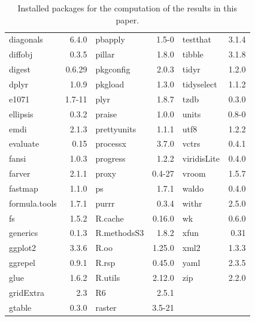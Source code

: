\begin{table}[h]
\begin{tabular}{lr|lr|lr}
			diagonals & 6.4.0 & pbapply & 1.5-0 & testthat & 3.1.4 \\
			diffobj & 0.3.5 & pillar & 1.8.0 & tibble & 3.1.8 \\
			digest & 0.6.29 & pkgconfig & 2.0.3 & tidyr & 1.2.0 \\
			dplyr & 1.0.9 & pkgload & 1.3.0 & tidyselect & 1.1.2 \\
			e1071 & 1.7-11 & plyr & 1.8.7 & tzdb & 0.3.0 \\
			ellipsis & 0.3.2 & praise & 1.0.0 & units & 0.8-0 \\
			emdi & 2.1.3 & prettyunits & 1.1.1 & utf8 & 1.2.2 \\
			evaluate & 0.15 & processx & 3.7.0 & vctrs & 0.4.1 \\
			fansi & 1.0.3 & progress & 1.2.2 & viridisLite & 0.4.0 \\
			farver & 2.1.1 & proxy & 0.4-27 & vroom & 1.5.7 \\
			fastmap & 1.1.0 & ps & 1.7.1 & waldo & 0.4.0 \\
			formula.tools & 1.7.1 & purrr & 0.3.4 & withr & 2.5.0 \\
			fs & 1.5.2 & R.cache & 0.16.0 & wk & 0.6.0 \\
			generics & 0.1.3 & R.methodsS3 & 1.8.2 & xfun & 0.31 \\
			ggplot2 & 3.3.6 & R.oo & 1.25.0 & xml2 & 1.3.3 \\
			ggrepel & 0.9.1 & R.rsp & 0.45.0 & yaml & 2.3.5 \\
			glue & 1.6.2 & R.utils & 2.12.0 & zip & 2.2.0 \\
			gridExtra & 2.3 & R6 & 2.5.1 &   &   \\
			gtable & 0.3.0 & raster & 3.5-21 &  &  \\
			\bottomrule
		\end{tabular}
	\caption{Installed packages for the computation of the results in this paper.}\label{tab:Rpackages}
\end{table}

\address{Sylvia Harmening, Ann-Kristin Kreutzmann, Sören Schmidt\\
  Institute for Statistics and Econometrics\\
  School of Business \& Economics \\
  Freie Universit\"at Berlin\\
  Garystr.~21, 14195 Berlin\\
  Germany\\
  ,
  ,\\
  }

